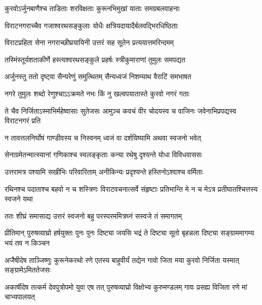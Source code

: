 \twolineshloka
{कुरवोऽर्जुनबाणैश्च ताडिताः शरविक्षताः}
{कुरूनभिमुखां याताः समग्रबलवाहनाः}


\twolineshloka
{विराटनगराच्चैव गजाश्वरथसङ्कुलाः}
{योधैः क्षत्रियदायादैर्बलवद्भिरधिष्ठिताः}


\twolineshloka
{विराटप्रहिता सेना नगराच्छीघ्रयायिनी}
{उत्तरं सह सूतेन प्रत्ययात्तमरिन्दमम्}


\twolineshloka
{तस्मिंस्तूर्यशताकीर्णे हस्त्यश्वरथसङ्कुले}
{प्रहर्षः स्त्रीकुमाराणां तुमुलः समपद्यत}


\twolineshloka
{अर्जुनस्तु ततो दृष्ट्वा सैन्यरेणुं समुत्थितम्}
{सैन्यध्वजं निशम्याथ वैराटिं समभाषत}


\twolineshloka
{नगरे तुमुलः शब्दो रेणुश्चाऽऽक्रमते नभः}
{किं नु खल्वपयातास्ते कुरवो नगरं गताः}


\threelineshloka
{ते चैव निर्जिताऽस्माभिर्महेष्वासाः सुतेजसः}
{आमुञ्च कवचं वीर चोदयस्व च वाजिनः}
{जवेनाभिप्रपद्यस्व विराटनगरं प्रति}


\twolineshloka
{न तावत्तलनिर्घोषं गाण्डीवस्य च निस्वनम्}
{ध्वजं वा दर्शयिष्यामि अथवा स्वजनो भवेत्}




\twolineshloka
{सेनाग्रमेतन्मात्स्यानां गणिकाश्च स्वलङ्कृताः}
{कन्या रथेषु दृश्यन्ते योधा विविधवाससः}


\twolineshloka
{उत्तरामत्र पश्यामि सखीभिः परिवारिताम्}
{अनीकिन्यः प्रदृश्यन्ते हस्तिनोऽश्वाश्च वर्मिताः}


\threelineshloka
{रथिनश्च पदाताश्च बहवो न च शस्त्रिणः}
{विराटवचनात्सर्वे संहृष्टाः प्रतिभान्ति मे}
{न च मेऽत्र प्रतीघातश्चित्तस्य स्वजने यथा}



\twolineshloka
{ततः शीघ्रं समासाद्य उत्तरं स्वजनो बहु}
{परस्परममित्रघ्नं सस्वजे तं समागतम्}




\threelineshloka
{प्रीतिमान् पुरुषव्याघ्रो हर्षयुक्तः पुनः पुनः}
{दिष्ट्या जयसि भद्रं ते दिष्ट्या सूतो बृहन्नला}
{दिष्ट्या सङ्ग्राममागम्य भयं तव न किञ्चन}




\threelineshloka
{अजैषीदेष ताञ्जिष्णुः कुरूनेकरथो रणे}
{एतस्य बाहुवीर्यं तद्येन गावो जिता मया}
{कुरवो निर्जिता यस्मात् सङ्ग्रामेऽमिततेजसः}


\threelineshloka
{अकार्षीदेष तत्कर्म देवपुत्रोपमो युवा}
{एष तत् पुरुषव्याघ्रो विक्षोभ्य कुरुमण्डलम्}
{गावः प्रसह्य विजिता रणे मां चाभ्यपालयत्}


